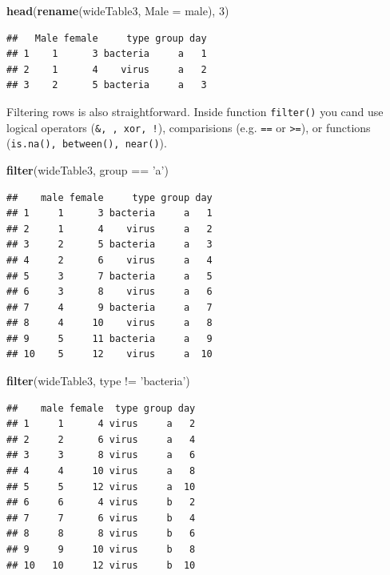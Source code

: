 \documentclass[]{book}
\newenvironment{Shaded}{\begin{snugshade}}{\end{snugshade}}
\newcommand{\KeywordTok}[1]{\textcolor[rgb]{0.12,0.11,0.11}{\textbf{#1}}}
\newcommand{\DataTypeTok}[1]{\textcolor[rgb]{0.00,0.34,0.68}{#1}}
\newcommand{\DecValTok}[1]{\textcolor[rgb]{0.69,0.50,0.00}{#1}}
\newcommand{\StringTok}[1]{\textcolor[rgb]{0.75,0.01,0.01}{#1}}
\newcommand{\OperatorTok}[1]{\textcolor[rgb]{0.12,0.11,0.11}{#1}}
\newcommand{\NormalTok}[1]{\textcolor[rgb]{0.12,0.11,0.11}{#1}}
\theoremstyle{definition}
\theoremstyle{definition}
\theoremstyle{definition}
\theoremstyle{remark}
\begin{document}
\begin{Shaded}
\begin{Highlighting}[]
\KeywordTok{head}\NormalTok{(}\KeywordTok{rename}\NormalTok{(wideTable3, }\DataTypeTok{Male =}\NormalTok{ male), }\DecValTok{3}\NormalTok{)}
\end{Highlighting}
\end{Shaded}

\begin{verbatim}
##   Male female     type group day
## 1    1      3 bacteria     a   1
## 2    1      4    virus     a   2
## 3    2      5 bacteria     a   3
\end{verbatim}

Filtering rows is also straightforward. Inside function
\texttt{filter()} you cand use logical operators
(\texttt{\&,\ \textbar{},\ xor,\ !}), comparisions (e.g. \texttt{==} or
\texttt{\textgreater{}=}), or functions
(\texttt{is.na(),\ between(),\ near()}).

\begin{Shaded}
\begin{Highlighting}[]
\KeywordTok{filter}\NormalTok{(wideTable3, group }\OperatorTok{==}\StringTok{ 'a'}\NormalTok{)}
\end{Highlighting}
\end{Shaded}

\begin{verbatim}
##    male female     type group day
## 1     1      3 bacteria     a   1
## 2     1      4    virus     a   2
## 3     2      5 bacteria     a   3
## 4     2      6    virus     a   4
## 5     3      7 bacteria     a   5
## 6     3      8    virus     a   6
## 7     4      9 bacteria     a   7
## 8     4     10    virus     a   8
## 9     5     11 bacteria     a   9
## 10    5     12    virus     a  10
\end{verbatim}

\begin{Shaded}
\begin{Highlighting}[]
\KeywordTok{filter}\NormalTok{(wideTable3, type }\OperatorTok{!=}\StringTok{ 'bacteria'}\NormalTok{)}
\end{Highlighting}
\end{Shaded}

\begin{verbatim}
##    male female  type group day
## 1     1      4 virus     a   2
## 2     2      6 virus     a   4
## 3     3      8 virus     a   6
## 4     4     10 virus     a   8
## 5     5     12 virus     a  10
## 6     6      4 virus     b   2
## 7     7      6 virus     b   4
## 8     8      8 virus     b   6
## 9     9     10 virus     b   8
## 10   10     12 virus     b  10
\end{verbatim}
\end{document}
